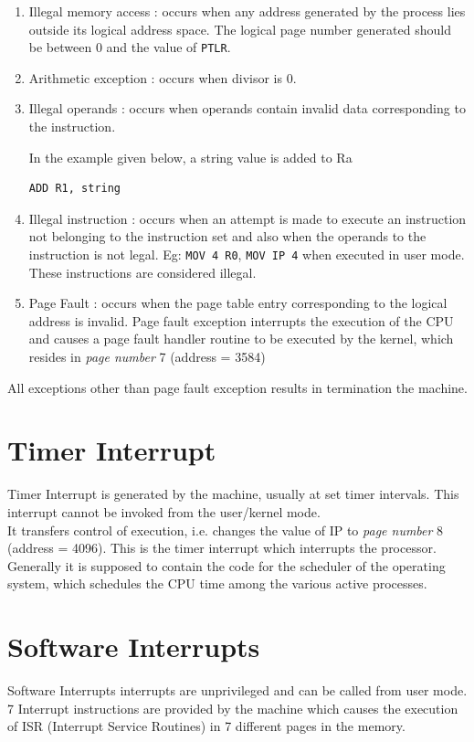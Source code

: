 \documentclass[11pt]{report}
\begin{document}
\begin{enumerate}
\item Illegal memory access : occurs when any address generated by the process lies outside its logical address space. The logical page number generated should be between 0 and the value of \texttt{PTLR}.
\item Arithmetic exception : occurs when divisor is 0.
\item Illegal operands : occurs when operands contain invalid data corresponding to the instruction.

In the example given below, a string value is added to Ra
 \begin{verbatim}
ADD R1, string
\end{verbatim}
\item Illegal instruction : occurs when an attempt is made to execute an instruction not belonging to the instruction set and also when the operands to the instruction is not legal. Eg: \texttt{MOV 4 R0}, \texttt{MOV IP 4} when executed in user mode. These instructions are considered illegal.
\item Page Fault : occurs when the page table entry corresponding to the logical address is invalid. Page fault exception interrupts the execution of the CPU and causes a page fault handler routine to be executed by the kernel, which resides in  \textit{page number} 7 (address = 3584)

\end{enumerate}
All exceptions other than page fault exception results in termination the machine. 

\section{Timer Interrupt }
Timer Interrupt is generated by the machine, usually at set timer intervals. This interrupt cannot be invoked from the user/kernel mode.\\

It transfers control of execution, i.e. changes the value of IP to \textit{page number} 8 (address = 4096). This is the timer interrupt which interrupts the processor. Generally it is supposed to contain the code for the scheduler of the operating system, which schedules the CPU time among the various active processes.

\section{Software Interrupts }
Software Interrupts interrupts are unprivileged and can be called from user mode. 7 Interrupt instructions are provided by the machine which causes the execution of ISR (Interrupt Service Routines) in 7 different pages in the memory. 
\end{document}
